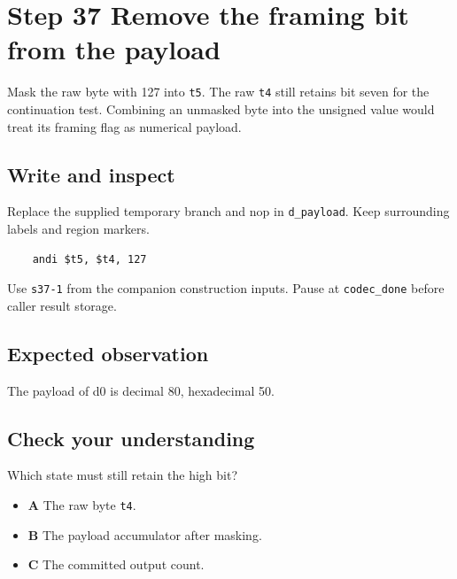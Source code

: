 \section{Step 37 Remove the framing bit from the payload}\label{delta-s37}

Mask the raw byte with 127 into \texttt{t5}. The raw \texttt{t4} still retains bit seven for the continuation test. Combining an unmasked byte into the unsigned value would treat its framing flag as numerical payload.

\subsection{Write and inspect}
Replace the supplied temporary branch and nop in \texttt{d\_payload}. Keep surrounding labels and region markers.

\begin{verbatim}
    andi $t5, $t4, 127
\end{verbatim}
Use \texttt{s37-1} from the companion construction inputs. Pause at \texttt{codec\_done} before caller result storage.

\subsection{Expected observation}
The payload of d0 is decimal 80, hexadecimal 50.

\subsection{Check your understanding}
Which state must still retain the high bit?

\begin{itemize}
\item \textbf{A} The raw byte \texttt{t4}.
\item \textbf{B} The payload accumulator after masking.
\item \textbf{C} The committed output count.
\end{itemize}

